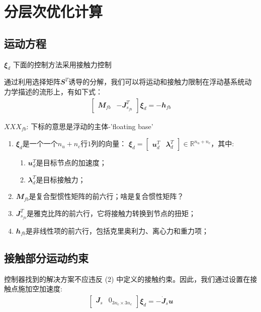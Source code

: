 

\chapter{分层次优化计算}


\section{运动方程}
${\mathbfit \xi}_d$
下面的控制方法采用接触力控制

通过利用选择矩阵$\mathbfit{S}^T$诱导的分解，我们可以将运动和接触力限制在浮动基系统动力学描述的流形上，有如下式\cite[p2]{Bellicoso_Jenelten_Fankhauser_Gehring_Hwangbo_Hutter_2017}：
\begin{align}
    \begin{bmatrix}{\mathbfit M}_{fb} & - {\mathbfit J}_{s_{fb}}^T \end{bmatrix} {\mathbfit \xi}_d = - {\mathbfit h}_{fb}
\end{align}

\begin{note}
    $XXX_{fb}$: 下标的意思是浮动的主体-'floating base'
\end{note}

\begin{enumerate}
    \item ${\mathbfit \xi}_d$是一个一个$n_u+n_c$行$1$列的向量： ${\mathbfit \xi}_d = \begin{bmatrix} {\mathbfit u}_d^T & {\mathbfit \lambda}_d^T \end{bmatrix} \in {\mathbb R}^{n_u+n_c}$，其中:
    \begin{enumerate}
        \item ${\mathbfit u}_d^T$是目标节点的加速度；
        \item ${\mathbfit \lambda}_d^T$是目标接触力；
    \end{enumerate}
    \item ${\mathbfit M}_{fb}$是复合型惯性矩阵的前六行；啥是复合惯性矩阵？
    \item ${\mathbfit J}_{s_{fb}}^T$是雅克比阵的前六行，它将接触力转换到节点的扭矩；
    \item ${\mathbfit h}_{fb}$是非线性项的前六行，包括克里奥利力、离心力和重力项；
\end{enumerate}
\section{接触部分运动约束}
控制器找到的解决方案不应违反 (2) 中定义的接触约束。因此，我们通过设置在接触点施加空加速度:
\begin{align}
    \begin{bmatrix} {\mathbfit J}_s & {\mathbfit 0}_{3n_c \times 3n_c}\end{bmatrix} {\mathbfit \xi}_d = - \dot {\mathbfit J}_s {\mathbfit u} 
\end{align}

